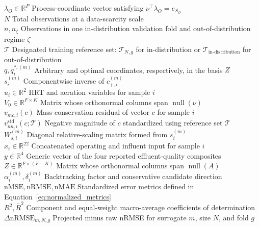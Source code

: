 \documentclass[a4paper,fleqn]{cas-sc}
\newcommand{\csvcomma}{,}
\begin{document}
\begin{tabbing}
$\lambda_O\in\mathbb{R}^{P}$ \> Process-coordinate vector satisfying $\nu^\top\lambda_O=e_{S_O}$ \\
$N$ \> Total observations at a data-scarcity scale \\
$n\csvcomma{}n_\zeta$ \> Observations in one in-distribution validation fold and out-of-distribution regime $\zeta$ \\
$\mathcal{T}$ \> Designated training reference set: $\mathcal{T}_{N\csvcomma{}g}$ for in-distribution or $\mathcal{T}_{\mathrm{in\text{-}distribution}}$ for out-of-distribution \\
$q\csvcomma{}q_i^{*\csvcomma{}(m)}$ \> Arbitrary and optimal coordinates\csvcomma{} respectively\csvcomma{} in the basis $Z$ \\
$s_i^{(m)}$ \> Componentwise inverse of $c_{+\csvcomma{}i}^{(m)}$ \\
$u_i\in\mathbb{R}^{2}$ \> HRT and aeration variables for sample $i$ \\
$V_0\in\mathbb{R}^{F\times K}$ \> Matrix whose orthonormal columns span $\operatorname{null}(\nu)$ \\
$v_{mc\csvcomma{}i}(c)$ \> Mass-conservation residual of vector $c$ for sample $i$ \\
$v_{nn\csvcomma{}i}^{\mathrm{std}}(c;\mathcal{T})$ \> Negative magnitude of $c$ standardized using reference set $\mathcal{T}$ \\
$W_{s\csvcomma{}i}^{(m)}$ \> Diagonal relative-scaling matrix formed from $s_i^{(m)}$ \\
$x_i\in\mathbb{R}^{22}$ \> Concatenated operating and influent input for sample $i$ \\
$y\in\mathbb{R}^{4}$ \> Generic vector of the four reported effluent-quality composites \\
$Z\in\mathbb{R}^{F\times(F-K)}$ \> Matrix whose orthonormal columns span $\operatorname{null}(A)$ \\
$\alpha_i^{(m)}\csvcomma{}\delta_i^{(m)}$ \> Backtracking factor and conservative candidate direction \\
$\mathrm{nMSE}\csvcomma{}\mathrm{nRMSE}\csvcomma{}\mathrm{nMAE}$ \> Standardized error metrics defined in Equation~\eqref{eq:normalized_metrics} \\
$R^2\csvcomma{}\bar R^2$ \> Component and equal-weight macro-average coefficients of determination \\
$\Delta\mathrm{nRMSE}_{m\csvcomma{}N\csvcomma{}g}$ \> Projected minus raw nRMSE for surrogate $m$\csvcomma{} size $N$\csvcomma{} and fold $g$ \\

\end{tabbing}
\end{document}
